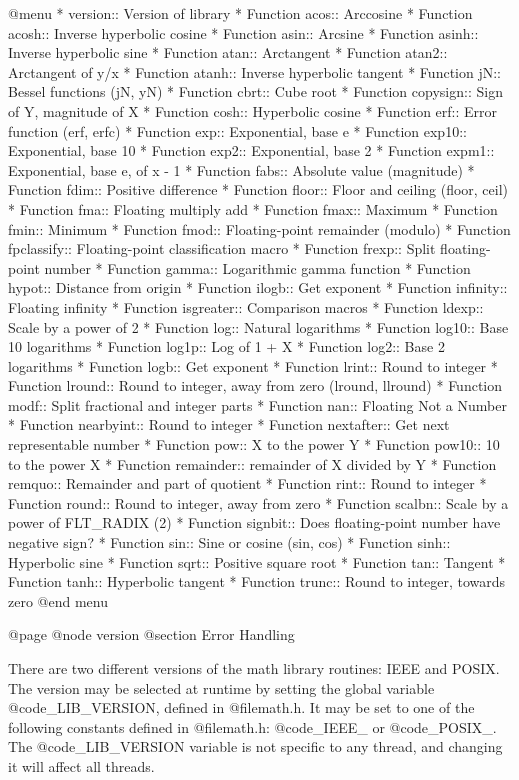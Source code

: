 @menu 
* version::	Version of library
* Function acos::	Arccosine
* Function acosh::	Inverse hyperbolic cosine
* Function asin::	Arcsine
* Function asinh::	Inverse hyperbolic sine
* Function atan::	Arctangent
* Function atan2::	Arctangent of y/x
* Function atanh::	Inverse hyperbolic tangent
* Function jN::	        Bessel functions (jN, yN)
* Function cbrt::	Cube root
* Function copysign::	Sign of Y, magnitude of X
* Function cosh::	Hyperbolic cosine
* Function erf::		Error function (erf, erfc)
* Function exp::		Exponential, base e
* Function exp10::	Exponential, base 10
* Function exp2::	Exponential, base 2
* Function expm1::	Exponential, base e, of x - 1
* Function fabs::	Absolute value (magnitude)
* Function fdim::	Positive difference
* Function floor::	Floor and ceiling (floor, ceil)
* Function fma::		Floating multiply add
* Function fmax::	Maximum
* Function fmin::	Minimum
* Function fmod::	Floating-point remainder (modulo)
* Function fpclassify::	Floating-point classification macro
* Function frexp::	Split floating-point number
* Function gamma::	Logarithmic gamma function
* Function hypot::	Distance from origin
* Function ilogb::	Get exponent
* Function infinity::	Floating infinity
* Function isgreater::	Comparison macros
* Function ldexp::	Scale by a power of 2
* Function log::		Natural logarithms
* Function log10::	Base 10 logarithms
* Function log1p::	Log of 1 + X
* Function log2::	Base 2 logarithms
* Function logb::	Get exponent
* Function lrint::	Round to integer
* Function lround::	Round to integer, away from zero (lround, llround)
* Function modf::	Split fractional and integer parts
* Function nan::		Floating Not a Number
* Function nearbyint::	Round to integer
* Function nextafter::	Get next representable number
* Function pow::		X to the power Y
* Function pow10::	10 to the power X
* Function remainder::	remainder of X divided by Y
* Function remquo::	Remainder and part of quotient
* Function rint::	Round to integer
* Function round::	Round to integer, away from zero
* Function scalbn::	Scale by a power of FLT_RADIX (2)
* Function signbit::	Does floating-point number have negative sign?
* Function sin::		Sine or cosine (sin, cos)
* Function sinh::	Hyperbolic sine
* Function sqrt::	Positive square root
* Function tan::		Tangent
* Function tanh::	Hyperbolic tangent
* Function trunc::	Round to integer, towards zero
@end menu

@page
@node version
@section Error Handling

There are two different versions of the math library routines: IEEE
and POSIX.  The version may be selected at runtime by
setting the global variable @code{_LIB_VERSION}, defined in
@file{math.h}.  It may be set to one of the following constants defined
in @file{math.h}: @code{_IEEE_} or @code{_POSIX_}.
The @code{_LIB_VERSION} variable is not specific to any
thread, and changing it will affect all threads.

